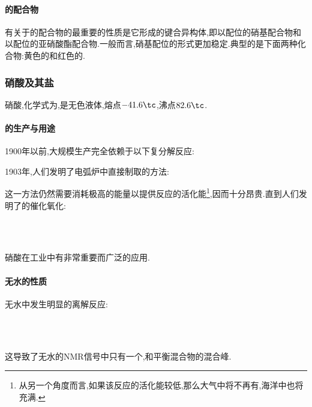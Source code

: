 \documentclass{ctexart}
\begin{document}
\paragraph{的配合物}
有关于的配合物的最重要的性质是它形成的键合异构体,即以配位的硝基配合物和以配位的亚硝酸酯配合物.一般而言,硝基配位的形式更加稳定.典型的是下面两种化合物:黄色的和红色的.

\subsubsection{硝酸及其盐}
\begin{substance}[\ce{HNO3}]
    硝酸,化学式为,是无色液体,熔点$-41.6\tc$,沸点$82.6\tc$.
\end{substance}
\paragraph{的生产与用途}
1900年以前,大规模生产完全依赖于以下复分解反应:
\begin{center}
\end{center}
1903年,人们发明了电弧炉中直接制取的方法:
\begin{center}
\end{center}
这一方法仍然需要消耗极高的能量以提供反应的活化能\footnote{从另一个角度而言,如果该反应的活化能较低,那么大气中将不再有,海洋中也将充满.},因而十分昂贵.直到人们发明了的催化氧化:
\begin{center}
    \\
    \\
\end{center}

\indent 硝酸在工业中有非常重要而广泛的应用.
\paragraph{无水的性质}
无水中发生明显的离解反应:
\begin{center}
    \\
    \\
\end{center}
这导致了无水的NMR信号中只有一个,和平衡混合物的混合峰.
\end{document}
